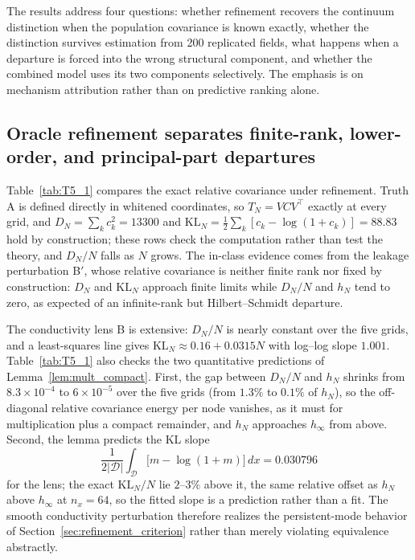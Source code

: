 \documentclass[11pt]{article}
\numberwithin{table}{section}
\numberwithin{figure}{section}
\begin{document}
The results address four questions: whether refinement recovers the continuum distinction when the population covariance is known exactly, whether the distinction survives estimation from 200 replicated fields, what happens when a departure is forced into the wrong structural component, and whether the combined model uses its two components selectively. The emphasis is on mechanism attribution rather than on predictive ranking alone.

\subsection{Oracle refinement separates finite-rank, lower-order, and principal-part departures}
\label{sec:results_oracle}

Table~\ref{tab:T5_1} compares the exact relative covariance under refinement. Truth A is defined directly in whitened coordinates, so $T_N=VCV^\top$ exactly at every grid, and $D_N=\sum_kc_k^2=13300$ and $\mathrm{KL}_N=\tfrac12\sum_k[c_k-\log(1+c_k)]=88.83$ hold by construction; these rows check the computation rather than test the theory, and $D_N/N$ falls as $N$ grows. The in-class evidence comes from the leakage perturbation B$'$, whose relative covariance is neither finite rank nor fixed by construction: $D_N$ and $\mathrm{KL}_N$ approach finite limits while $D_N/N$ and $h_N$ tend to zero, as expected of an infinite-rank but Hilbert--Schmidt departure.

The conductivity lens B is extensive: $D_N/N$ is nearly constant over the five grids, and a least-squares line gives $\mathrm{KL}_N\approx0.16+0.0315N$ with log--log slope $1.001$. Table~\ref{tab:T5_1} also checks the two quantitative predictions of Lemma~\ref{lem:mult_compact}. First, the gap between $D_N/N$ and $h_N$ shrinks from $8.3\times10^{-4}$ to $6\times10^{-5}$ over the five grids (from $1.3\%$ to $0.1\%$ of $h_N$), so the off-diagonal relative covariance energy per node vanishes, as it must for multiplication plus a compact remainder, and $h_N$ approaches $h_\infty$ from above. Second, the lemma predicts the KL slope
\begin{equation}
    \frac{1}{2|\mathcal D|}\int_{\mathcal D}\big[m-\log(1+m)\big]\,dx=0.030796
\end{equation}
for the lens; the exact $\mathrm{KL}_N/N$ lie $2$--$3\%$ above it, the same relative offset as $h_N$ above $h_\infty$ at $n_x=64$, so the fitted slope is a prediction rather than a fit. The smooth conductivity perturbation therefore realizes the persistent-mode behavior of Section~\ref{sec:refinement_criterion} rather than merely violating equivalence abstractly.
\end{document}

